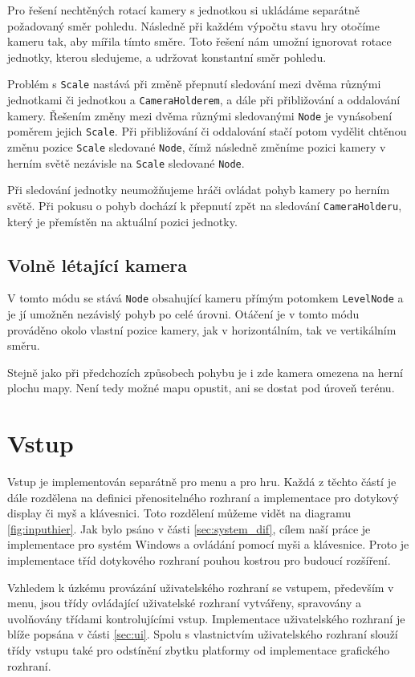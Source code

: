 Pro řešení nechtěných rotací kamery s jednotkou si ukládáme separátně požadovaný směr pohledu. Následně při každém výpočtu stavu hry otočíme kameru tak, aby mířila tímto směre. Toto řešení nám umožní ignorovat rotace jednotky, kterou sledujeme, a udržovat konstantní směr pohledu. 

Problém s \texttt{Scale} nastává při změně přepnutí sledování mezi dvěma různými jednotkami či jednotkou a \texttt{CameraHolderem}, a dále při přibližování a oddalování kamery. Řešením změny mezi dvěma různými sledovanými \texttt{Node} je vynásobení poměrem jejich \texttt{Scale}. Při přibližování či oddalování stačí potom vydělit chtěnou změnu pozice \texttt{Scale} sledované \texttt{Node}, čímž následně změníme pozici kamery v herním světě nezávisle na \texttt{Scale} sledované \texttt{Node}.

Při sledování jednotky neumožňujeme hráči ovládat pohyb kamery po herním světě. Při pokusu o pohyb dochází k přepnutí zpět na sledování \texttt{CameraHolderu}, který je přemístěn na aktuální pozici jednotky.

\subsection{Volně létající kamera}
V tomto módu se stává \texttt{Node} obsahující kameru přímým potomkem \texttt{LevelNode} a je jí umožněn nezávislý pohyb po celé úrovni. Otáčení je v tomto módu prováděno okolo vlastní pozice kamery, jak v horizontálním, tak ve vertikálním směru. 

Stejně jako při předchozích způsobech pohybu je i zde kamera omezena na herní plochu mapy. Není tedy možné mapu opustit, ani se dostat pod úroveň terénu.

\section{Vstup}
\label{sec:input}
Vstup je implementován separátně pro menu a pro hru. Každá z těchto částí je dále rozdělena na definici přenositelného rozhraní a implementace pro dotykový display či myš a klávesnici. Toto rozdělení můžeme vidět na diagramu \ref{fig:inputhier}. Jak bylo psáno v části \ref{sec:system_dif}, cílem naší práce je implementace pro systém Windows a ovládání pomocí myši a klávesnice. Proto je implementace tříd dotykového rozhraní pouhou kostrou pro budoucí rozšíření. 

Vzhledem k úzkému provázání uživatelského rozhraní se vstupem, především v menu, jsou třídy ovládající uživatelské rozhraní vytvářeny, spravovány a uvolňovány třídami kontrolujícími vstup. Implementace uživatelského rozhraní je blíže popsána v části \ref{sec:ui}. Spolu s vlastnictvím uživatelského rozhraní slouží třídy vstupu také pro odstínění zbytku platformy od implementace grafického rozhraní. 


